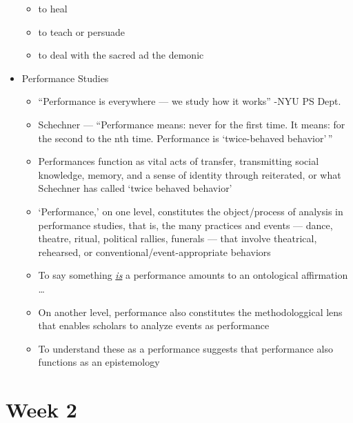 \documentclass[12pt]{article}
\begin{document}
\begin{itemize}
\begin{itemize}
                    \item to heal 
                    \item to teach or persuade 
                    \item to deal with the sacred ad the demonic
                \end{itemize}
                \item Performance Studies
                \begin{itemize}
                    \item ``Performance is everywhere --- we study how it works'' -NYU PS Dept.
                    \item Schechner --- ``Performance means: never for the first time. It means: for the second to the nth time. Performance is `twice-behaved behavior'\,''
                    \item Performances function as vital acts of transfer, transmitting social knowledge, memory, and a sense of identity through reiterated, or what Schechner has called `twice behaved behavior'
                    \item `Performance,' on one level, constitutes the object/process of analysis in performance studies, that is, the many practices and events --- dance, theatre, ritual, political rallies, funerals --- that involve theatrical, rehearsed, or conventional/event-appropriate behaviors
                    \item To say something \textit{\underline{is}} a performance amounts to an ontological affirmation \dots
                    \item On another level, performance also constitutes the methodologgical lens that enables scholars to analyze events as performance 
                    \item To understand these as a performance suggests that performance also functions as an epistemology
                \end{itemize}
            \end{itemize}
            \bigskip
    \section{Week 2}
        \bigskip
\end{document}
